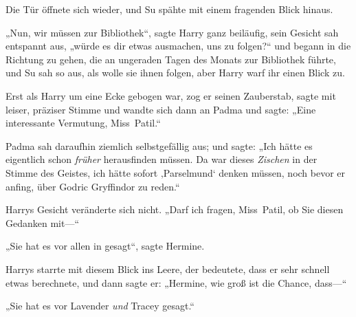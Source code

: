 Die Tür öffnete sich wieder, und Su spähte mit einem fragenden Blick hinaus.

„Nun, wir müssen zur Bibliothek“, sagte Harry ganz beiläufig, sein Gesicht sah entspannt aus, „würde es dir etwas ausmachen, uns zu folgen?“ und begann in die Richtung zu gehen, die an ungeraden Tagen des Monats zur Bibliothek führte, und Su sah so aus, als wolle sie ihnen folgen, aber Harry warf ihr einen Blick zu.

Erst als Harry um eine Ecke gebogen war, zog er seinen Zauberstab, sagte mit leiser, präziser Stimme  und wandte sich dann an Padma und sagte: „Eine interessante Vermutung, Miss~Patil.“

Padma sah daraufhin ziemlich selbstgefällig aus; und sagte: „Ich hätte es eigentlich schon \emph{früher} herausfinden müssen. Da war dieses \emph{Zischen} in der Stimme des Geistes, ich hätte sofort ‚Parselmund‘ denken müssen, noch bevor er anfing, über Godric Gryffindor zu reden.“

Harrys Gesicht veränderte sich nicht. „Darf ich fragen, Miss~Patil, ob Sie diesen Gedanken mit—“

„Sie hat es vor allen in \SPHEW gesagt“, sagte Hermine.

Harrys starrte mit diesem Blick ins Leere, der bedeutete, dass er sehr schnell etwas berechnete, und dann sagte er: „Hermine, wie groß ist die Chance, dass—“

„Sie hat es vor Lavender \emph{und} Tracey gesagt.“

